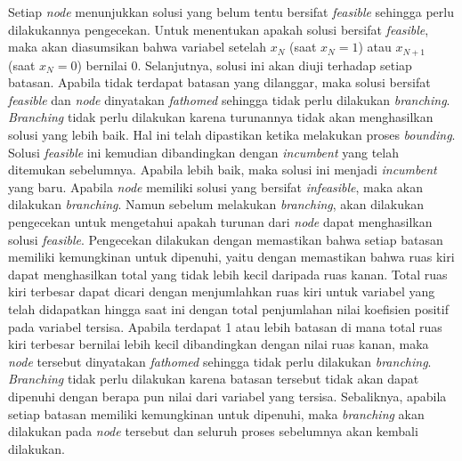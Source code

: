 Setiap \textit{node} menunjukkan solusi yang belum tentu bersifat \textit{feasible} sehingga perlu dilakukannya pengecekan. Untuk menentukan apakah solusi bersifat \textit{feasible}, maka akan diasumsikan bahwa variabel setelah \(x_N\) (saat \(x_N=1\)) atau \(x_{N+1}\) (saat \(x_N=0\)) bernilai 0. Selanjutnya, solusi ini akan diuji terhadap setiap batasan. Apabila tidak terdapat batasan yang dilanggar, maka solusi bersifat \textit{feasible} dan \textit{node} dinyatakan \textit{fathomed} sehingga tidak perlu dilakukan \textit{branching}. \textit{Branching} tidak perlu dilakukan karena turunannya tidak akan menghasilkan solusi yang lebih baik. Hal ini telah dipastikan ketika melakukan proses \textit{bounding}. Solusi \textit{feasible} ini kemudian dibandingkan dengan \textit{incumbent} yang telah ditemukan sebelumnya. Apabila lebih baik, maka solusi ini menjadi \textit{incumbent} yang baru. Apabila \textit{node} memiliki solusi yang bersifat \textit{infeasible}, maka akan dilakukan \textit{branching}. Namun sebelum melakukan \textit{branching}, akan dilakukan pengecekan untuk mengetahui apakah turunan dari \textit{node} dapat menghasilkan solusi \textit{feasible}. Pengecekan dilakukan dengan memastikan bahwa setiap batasan memiliki kemungkinan untuk dipenuhi, yaitu dengan memastikan bahwa ruas kiri dapat menghasilkan total yang tidak lebih kecil daripada ruas kanan. Total ruas kiri terbesar dapat dicari dengan menjumlahkan ruas kiri untuk variabel yang telah didapatkan hingga saat ini dengan total penjumlahan nilai koefisien positif pada variabel tersisa. Apabila terdapat 1 atau lebih batasan di mana total ruas kiri terbesar bernilai lebih kecil dibandingkan dengan nilai ruas kanan, maka \textit{node} tersebut dinyatakan \textit{fathomed} sehingga tidak perlu dilakukan \textit{branching}. \textit{Branching} tidak perlu dilakukan karena batasan tersebut tidak akan dapat dipenuhi dengan berapa pun nilai dari variabel yang tersisa. Sebaliknya, apabila setiap batasan memiliki kemungkinan untuk dipenuhi, maka \textit{branching} akan dilakukan pada \textit{node} tersebut dan seluruh proses sebelumnya akan kembali dilakukan.

